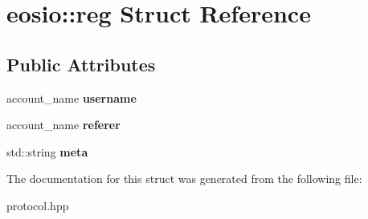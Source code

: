 \hypertarget{structeosio_1_1reg}{}\section{eosio\+:\+:reg Struct Reference}
\label{structeosio_1_1reg}
\subsection*{Public Attributes}
\begin{DoxyCompactItemize}
\item 
\mbox{\label{structeosio_1_1reg_a5507fe7155337b3f136e9e79fbfacdd6}} 
account\+\_\+name {\bfseries username}
\item 
\mbox{\label{structeosio_1_1reg_a97a771887510681e453dcc898414a153}} 
account\+\_\+name {\bfseries referer}
\item 
\mbox{\label{structeosio_1_1reg_afcfd8c77c673eca2573b5b2ce206ec7c}} 
std\+::string {\bfseries meta}
\end{DoxyCompactItemize}


The documentation for this struct was generated from the following file\+:\begin{DoxyCompactItemize}
\item 
protocol.\+hpp\end{DoxyCompactItemize}
